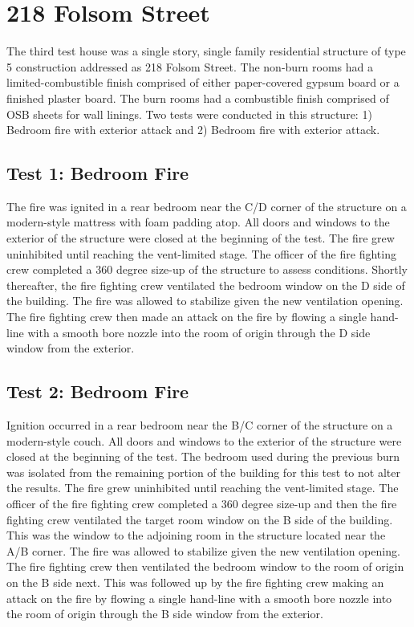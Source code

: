 \documentclass{article}
\begin{document}
\section{218 Folsom Street}

The third test house was a single story, single family residential structure of type 5 construction addressed as 218 Folsom Street. The non-burn rooms had a limited-combustible finish comprised of either paper-covered gypsum board or a finished plaster board.  The burn rooms had a combustible finish comprised of OSB sheets for wall linings.  Two tests were conducted in this structure: 1) Bedroom fire with exterior attack and 2) Bedroom fire with exterior attack. 

\subsection{Test 1: Bedroom Fire}

The fire was ignited in a rear bedroom near the C/D corner of the structure on a modern-style mattress with foam padding atop. All doors and windows to the exterior of the structure were closed at the beginning of the test. The fire grew uninhibited until reaching the vent-limited stage. The officer of the fire fighting crew completed a 360 degree size-up of the structure to assess conditions.  Shortly thereafter, the fire fighting crew ventilated the bedroom window on the D side of the building. The fire was allowed to stabilize given the new ventilation opening. The fire fighting crew then made an attack on the fire by flowing a single hand-line with a smooth bore nozzle into the room of origin through the D side window from the exterior.

\subsection{Test 2: Bedroom Fire}

Ignition occurred in a rear bedroom near the B/C corner of the structure on a modern-style couch. All doors and windows to the exterior of the structure were closed at the beginning of the test. The bedroom used during the previous burn was isolated from the remaining portion of the building for this test to not alter the results. The fire grew uninhibited until reaching the vent-limited stage. The officer of the fire fighting crew completed a 360 degree size-up and then the fire fighting crew ventilated the target room window on the B side of the building. This was the window to the adjoining room in the structure located near the A/B corner. The fire was allowed to stabilize given the new ventilation opening. The fire fighting crew then ventilated the bedroom window to the room of origin on the B side next.  This was followed up by the fire fighting crew making an attack on the fire by flowing a single hand-line with a smooth bore nozzle into the room of origin through the B side window from the exterior.
\end{document}
